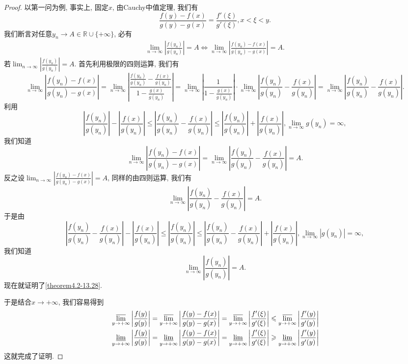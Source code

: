 \documentclass[../../main.tex]{subfiles}%
\begin{document}
\begin{proof}
以第一问为例, 事实上, 固定\(x\), 由Cauchy中值定理, 我们有
\[
\frac{f(y)-f(x)}{g(y)-g(x)}=\frac{f'(\xi)}{g'(\xi)},x < \xi < y.
\]
我们断言对任意\(y_n\to A \in \mathbb{R} \cup \{+\infty\}\), 必有
\begin{align}\label{theorem4.2-13.28}
\lim_{n\rightarrow\infty}\left|\frac{f(y_n)}{g(y_n)}\right| = A \Leftrightarrow \lim_{n\rightarrow\infty}\left|\frac{f(y_n)-f(x)}{g(y_n)-g(x)}\right| = A.
\end{align}
若\(\lim_{n\rightarrow\infty}\left|\frac{f(y_n)}{g(y_n)}\right| = A\). 首先利用极限的四则运算, 我们有
\[
\lim_{n\rightarrow\infty}\left|\frac{f(y_n)-f(x)}{g(y_n)-g(x)}\right|=\lim_{n\rightarrow\infty}\left|\frac{\frac{f(y_n)}{g(y_n)}-\frac{f(x)}{g(y_n)}}{1 - \frac{g(x)}{g(y_n)}}\right|=\lim_{n\rightarrow\infty}\left|\frac{1}{1 - \frac{g(x)}{g(y_n)}}\right|\cdot\lim_{n\rightarrow\infty}\left|\frac{f(y_n)}{g(y_n)}-\frac{f(x)}{g(y_n)}\right|=\lim_{n\rightarrow\infty}\left|\frac{f(y_n)}{g(y_n)}-\frac{f(x)}{g(y_n)}\right|.
\]
利用
\[
\left|\frac{f(y_n)}{g(y_n)}\right|-\left|\frac{f(x)}{g(y_n)}\right|\leqslant\left|\frac{f(y_n)}{g(y_n)}-\frac{f(x)}{g(y_n)}\right|\leqslant\left|\frac{f(y_n)}{g(y_n)}\right|+\left|\frac{f(x)}{g(y_n)}\right|, \lim_{n\rightarrow\infty} g(y_n) = \infty,
\]
我们知道
\[
\lim_{n\rightarrow\infty}\left|\frac{f(y_n)-f(x)}{g(y_n)-g(x)}\right|=\lim_{n\rightarrow\infty}\left|\frac{f(y_n)}{g(y_n)}-\frac{f(x)}{g(y_n)}\right| = A.
\]
反之设\(\lim_{n\rightarrow\infty}\left|\frac{f(y_n)-f(x)}{g(y_n)-g(x)}\right| = A\), 同样的由四则运算, 我们有
\[
\lim_{n\rightarrow\infty}\left|\frac{f(y_n)}{g(y_n)}-\frac{f(x)}{g(y_n)}\right| = A.
\]
于是由
\[
\left|\frac{f(y_n)}{g(y_n)}-\frac{f(x)}{g(y_n)}\right|-\left|\frac{f(x)}{g(y_n)}\right|\leqslant\left|\frac{f(y_n)}{g(y_n)}\right|\leqslant\left|\frac{f(y_n)}{g(y_n)}-\frac{f(x)}{g(y_n)}\right|+\left|\frac{f(x)}{g(y_n)}\right|, \lim_{n\rightarrow\infty}|g(y_n)| = \infty,
\]
我们知道
\[
\lim_{n\rightarrow\infty}\left|\frac{f(y_n)}{g(y_n)}\right| = A.
\]
现在就证明了\eqref{theorem4.2-13.28}.

于是结合\(x \to +\infty\), 我们容易得到
\begin{align*}
&\varlimsup_{y\rightarrow+\infty}\left|\frac{f(y)}{g(y)}\right|=\varlimsup_{y\rightarrow+\infty}\left|\frac{f(y)-f(x)}{g(y)-g(x)}\right|=\varlimsup_{y\rightarrow+\infty}\left|\frac{f'(\xi)}{g'(\xi)}\right|\leqslant\varlimsup_{y\rightarrow+\infty}\left|\frac{f'(y)}{g'(y)}\right|\\
&\varliminf_{y\rightarrow+\infty}\left|\frac{f(y)}{g(y)}\right|=\varliminf_{y\rightarrow+\infty}\left|\frac{f(y)-f(x)}{g(y)-g(x)}\right|=\varliminf_{y\rightarrow+\infty}\left|\frac{f'(\xi)}{g'(\xi)}\right|\geqslant\varliminf_{y\rightarrow+\infty}\left|\frac{f'(y)}{g'(y)}\right|
\end{align*}
这就完成了证明.
\end{proof}
\end{document}
